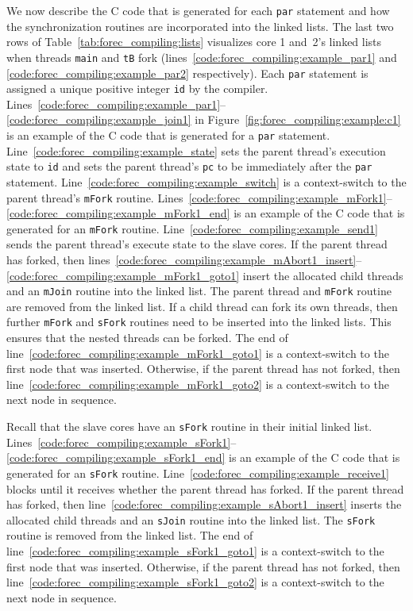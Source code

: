 We now describe the C code that is generated for each
\verb$par$ statement and how the synchronization routines
are incorporated into the linked lists. 
The last two rows of Table~\ref{tab:forec_compiling:lists} 
visualizes core 1 and~2's linked 
lists when threads \verb$main$ and \verb$tB$ fork 
(lines~\ref{code:forec_compiling:example_par1} and 
\ref{code:forec_compiling:example_par2} respectively). 
Each \verb$par$ 
statement is assigned a unique positive integer 
\verb$id$ by the compiler.
Lines~\ref{code:forec_compiling:example_par1}--\ref{code:forec_compiling:example_join1}
in Figure~\ref{fig:forec_compiling:example:c1} is an 
example of the C code that is generated for a \verb$par$ 
statement. Line~\ref{code:forec_compiling:example_state}
sets the parent thread's execution state to \verb$id$
and sets the 
parent thread's \verb$pc$ to be immediately after the 
\verb$par$ statement. Line~\ref{code:forec_compiling:example_switch}
is a context-switch to the parent thread's 
\verb$mFork$ routine. 
Lines~\ref{code:forec_compiling:example_mFork1}--\ref{code:forec_compiling:example_mFork1_end}
is an example of the C code that is generated for an 
\verb$mFork$ routine. Line~\ref{code:forec_compiling:example_send1}
sends the parent thread's execute state to the slave cores.
If the parent thread has forked, then 
lines~\ref{code:forec_compiling:example_mAbort1_insert}--\ref{code:forec_compiling:example_mFork1_goto1}
insert the allocated child threads and an \verb$mJoin$ 
routine into the linked list. The parent thread and 
\verb$mFork$ routine are removed from the linked list.
If a child thread can fork its own threads,
then further \verb$mFork$ and \verb$sFork$ routines need to be
inserted into the linked lists. This ensures that the nested
threads can be forked. 
The end of line~\ref{code:forec_compiling:example_mFork1_goto1} is
a context-switch to the first node that was inserted. 
Otherwise, if the parent thread has not forked, then
line~\ref{code:forec_compiling:example_mFork1_goto2} is
a context-switch to the next node in sequence.

Recall that the slave cores have an \verb$sFork$
routine in their initial linked list. 
Lines~\ref{code:forec_compiling:example_sFork1}--\ref{code:forec_compiling:example_sFork1_end}
is an example of the C code that is generated for an \verb$sFork$
routine. Line~\ref{code:forec_compiling:example_receive1}
blocks until it receives whether the parent thread has
forked. If the parent thread has forked, then 
line~\ref{code:forec_compiling:example_sAbort1_insert}
inserts the allocated child threads and an \verb$sJoin$
routine into the linked list. The \verb$sFork$ routine 
is removed from the linked list. The end of 
line~\ref{code:forec_compiling:example_sFork1_goto1} is
a context-switch to the first node that was inserted.
Otherwise, if the parent thread has not forked, then
line~\ref{code:forec_compiling:example_sFork1_goto2} is
a context-switch to the next node in sequence.

